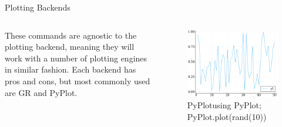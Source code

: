 \documentclass{beamer}
\begin{document}
\begin{frame}[fragile]{Plotting Backends}
	\begin{columns}
	These commands are agnostic to the plotting backend, meaning they will work with a number of plotting engines in similar fashion. Each backend has pros and cons, but most commonly used are {\color{red} GR and PyPlot}.
	
	\begin{figure}[h]
		\centering
		\includegraphics[width=.75\textwidth]{images_data/randPlotPy}
		\caption{\centering  PyPlot\newline \tiny using PyPlot; PyPlot.plot(rand(10))}
	\end{figure}


\end{columns}
\end{frame}
\end{document}
